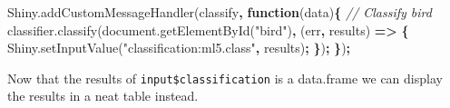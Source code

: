 \documentclass[
]{krantz}
\makeatletter
\newenvironment{Shaded}{\begin{snugshade}}{\end{snugshade}}
\newcommand{\AttributeTok}[1]{\textcolor[rgb]{0.61,0.61,0.61}{#1}}
\newcommand{\CommentTok}[1]{\textcolor[rgb]{0.37,0.37,0.37}{\textit{#1}}}
\newcommand{\KeywordTok}[1]{\textcolor[rgb]{0.27,0.27,0.27}{\textbf{#1}}}
\newcommand{\NormalTok}[1]{#1}
\newcommand{\OperatorTok}[1]{\textcolor[rgb]{0.43,0.43,0.43}{\textbf{#1}}}
\newcommand{\StringTok}[1]{\textcolor[rgb]{0.5,0.5,0.5}{#1}}
\newcommand{\VariableTok}[1]{\textcolor[rgb]{0,0,0}{#1}}
\newenvironment{kframe}{%
\medskip{}
\setlength{\fboxsep}{.8em}
 \def\at@end@of@kframe{}%
 \ifinner\ifhmode%
  \def\at@end@of@kframe{\end{minipage}}%
  \begin{minipage}{\columnwidth}%
 \fi\fi%
 \def\FrameCommand##1{\hskip\@totalleftmargin \hskip-\fboxsep
 \colorbox{shadecolor}{##1}\hskip-\fboxsep
     \hskip-\linewidth \hskip-\@totalleftmargin \hskip\columnwidth}%
 \MakeFramed {\advance\hsize-\width
   \@totalleftmargin\z@ \linewidth\hsize
   \@setminipage}}%
 {\par\unskip\endMakeFramed%
 \at@end@of@kframe}
\renewenvironment{Shaded}{\begin{kframe}}{\end{kframe}}
\makeatother
\begin{document}
\begin{Shaded}
\begin{Highlighting}[]
\VariableTok{Shiny}\NormalTok{.}\AttributeTok{addCustomMessageHandler}\NormalTok{(}\StringTok{\textquotesingle{}classify\textquotesingle{}}\OperatorTok{,} \KeywordTok{function}\NormalTok{(data)}\OperatorTok{\{}
  \CommentTok{// Classify bird}
  \VariableTok{classifier}\NormalTok{.}\AttributeTok{classify}\NormalTok{(}\VariableTok{document}\NormalTok{.}\AttributeTok{getElementById}\NormalTok{(}\StringTok{"bird"}\NormalTok{)}\OperatorTok{,}\NormalTok{ (err}\OperatorTok{,}\NormalTok{ results) }\KeywordTok{=>} \OperatorTok{\{}
    \VariableTok{Shiny}\NormalTok{.}\AttributeTok{setInputValue}\NormalTok{(}\StringTok{"classification:ml5.class"}\OperatorTok{,}\NormalTok{ results)}\OperatorTok{;}
  \OperatorTok{\}}\NormalTok{)}\OperatorTok{;}
\OperatorTok{\}}\NormalTok{)}\OperatorTok{;}
\end{Highlighting}
\end{Shaded}

Now that the results of \texttt{input\$classification} is a data.frame we can display the results in a neat table instead.
\end{document}
